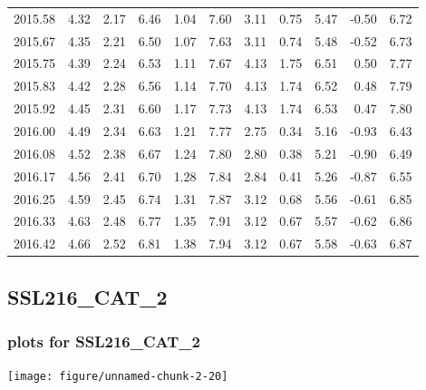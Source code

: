 \documentclass[10pt,a4paper]{article}\usepackage[]{graphicx}\usepackage[]{color}
\makeatletter
\def\maxwidth{ %
  \ifdim\Gin@nat@width>\linewidth
    \linewidth
  \else
    \Gin@nat@width
  \fi
}
\newcommand{\AaA}{\_}
\makeatother
\begin{document}
\begin{table}[ht]
\begin{tabular}{rrrrrrrrrrr}
  2015.58 & 4.32 & 2.17 & 6.46 & 1.04 & 7.60 & 3.11 & 0.75 & 5.47 & -0.50 & 6.72 \\ 
  2015.67 & 4.35 & 2.21 & 6.50 & 1.07 & 7.63 & 3.11 & 0.74 & 5.48 & -0.52 & 6.73 \\ 
  2015.75 & 4.39 & 2.24 & 6.53 & 1.11 & 7.67 & 4.13 & 1.75 & 6.51 & 0.50 & 7.77 \\ 
  2015.83 & 4.42 & 2.28 & 6.56 & 1.14 & 7.70 & 4.13 & 1.74 & 6.52 & 0.48 & 7.79 \\ 
  2015.92 & 4.45 & 2.31 & 6.60 & 1.17 & 7.73 & 4.13 & 1.74 & 6.53 & 0.47 & 7.80 \\ 
  2016.00 & 4.49 & 2.34 & 6.63 & 1.21 & 7.77 & 2.75 & 0.34 & 5.16 & -0.93 & 6.43 \\ 
  2016.08 & 4.52 & 2.38 & 6.67 & 1.24 & 7.80 & 2.80 & 0.38 & 5.21 & -0.90 & 6.49 \\ 
  2016.17 & 4.56 & 2.41 & 6.70 & 1.28 & 7.84 & 2.84 & 0.41 & 5.26 & -0.87 & 6.55 \\ 
  2016.25 & 4.59 & 2.45 & 6.74 & 1.31 & 7.87 & 3.12 & 0.68 & 5.56 & -0.61 & 6.85 \\ 
  2016.33 & 4.63 & 2.48 & 6.77 & 1.35 & 7.91 & 3.12 & 0.67 & 5.57 & -0.62 & 6.86 \\ 
  2016.42 & 4.66 & 2.52 & 6.81 & 1.38 & 7.94 & 3.12 & 0.67 & 5.58 & -0.63 & 6.87 \\ 
   \hline
\end{tabular}
\end{table}

\newpage
\subsection{SSL216\AaA CAT\AaA 2}
\subsubsection{plots for SSL216\AaA CAT\AaA 2}

\texttt{[image: figure/unnamed-chunk-2-20]} 

\newpage
\end{document}
